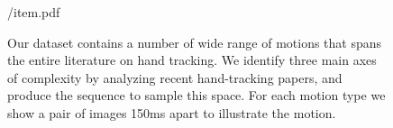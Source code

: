 \begin{figure}[t!]
\centering
\begin{overpic} 
[width=\linewidth]
{\currfiledir/item.pdf}
\end{overpic}
\caption{
% 
Our dataset contains a number of wide range of motions that spans the entire literature on hand tracking. We identify three main axes of complexity by analyzing recent hand-tracking papers, and produce the  sequence to sample this space. 
% 
For each motion type we show a pair of images 150ms apart to illustrate the motion.
% 
}
\label{fig:motiontypes}
\end{figure}